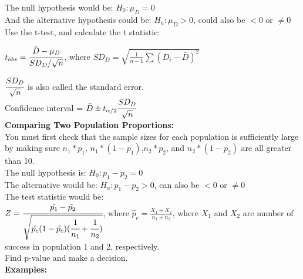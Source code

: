 \documentclass[12pt]{article}
\begin{document}
\noindent The null hypothesis would be: $H_{0}: \mu_{D}=0$\\

\noindent And the alternative hypothesis could be: $H_{a}: \mu_{D} >0$, could also be $<0$ or $\neq 0$\\

Use the t-test, and calculate the t statistic:\\
\begin{center}
$t_{obs} = \cfrac{\bar{D}-\mu_{D}}{SD_{D}/\sqrt{n}}$, where $SD_{D} = \sqrt{\frac{1}{n-1}\sum(D_{i}-\bar{D})^{2}}$
\end{center}
$\cfrac{SD_{D}}{\sqrt{n}}$ is also called the standard error. \\

\noindent Confidence interval = $\bar{D} \pm t_{\alpha/2}\cfrac{SD_{D}}{\sqrt{n}}$ \\ 
\newpage
\noindent \textbf{Comparing Two Population Proportions:}\\
You must first check that the sample sizes for each population is sufficiently large by making sure $n_{1}*p_{1}$, $n_{1}*(1-p_{1})$,$n_{2}*p_{2}$, and $n_{2}*(1-p_{2})$ are all greater than 10.\\
The null hypothesis is: $H_{0}: p_{1}-p_{2}=0$\\
The alternative would be: $H_{a}: p_{1}-p_{2} > 0$, can also be $<0$ or $\neq 0$\\
  
\noindent The test statistic would be:\\
$Z=\cfrac{\hat{p_{1}}-\hat{p_{2}}}{\sqrt{\hat{p_{c}}(1-\hat{p_{c}})(\cfrac{1}{n_{1}}+\cfrac{1}{n_{2}})}}$, where $\hat{p}_{c} = \frac{X_{1}+X_{2}}{n_{1}+n_{2}}$, where $X_{1}$ and $X_{2}$ are number of success in population 1 and 2, respectively. \\

\noindent Find p-value and make a decision.\\

\noindent \textbf{Examples:}
\end{document}
